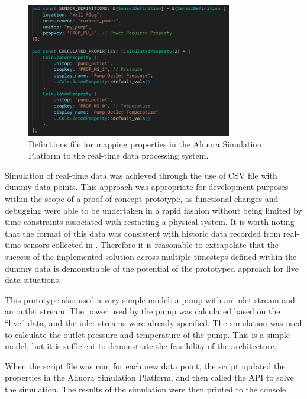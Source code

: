 \begin{figure}
    \centering
    \includegraphics[width=0.8\textwidth]{live_constants.png}
    \caption{Definitions file for mapping properties in the Ahuora Simulation Platform to the real-time data processing system.}
    \label{fig:live-constants}
\end{figure}

Simulation of real-time data was achieved through the use of CSV file with dummy data points.  
This approach was appropriate for development purposes within the scope of a proof of concept prototype, as functional changes and debugging were able to be undertaken in a rapid fashion without being limited by time constraints associated with restarting a physical system. It is worth noting that the format of this data was consistent with historic data recorded from real-time sensors collected in . Therefore it is reasonable to extrapolate that the success of the implemented solution across multiple timesteps defined within the dummy data is demonstrable of the potential of the prototyped approach for live data situations.

This prototype also used a very simple model: a pump with an inlet stream and an outlet stream. 
The power used by the pump was calculated based on the  ``live'' data, and the inlet streams were already specified. 
The simulation was used to calculate the outlet pressure and temperature of the pump. This is a simple model, but it is sufficient to demonstrate the feasibility of the architecture.


When the script file was run, for each new data point, the script updated the properties in the Ahuora Simulation Platform, and then called the API to solve the simulation. The results of the simulation were then printed to the console. 

